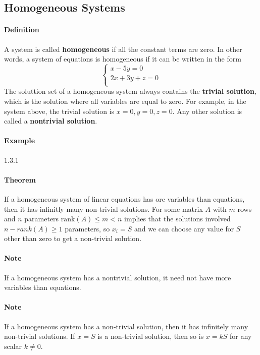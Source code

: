 \subsection{Homogeneous Systems}
\hrulefill

\paragraph*{Definition} A system is called \textbf{homogeneous} if all the constant terms are zero. In other words, a system of equations is homogeneous if it can be written in the form
\[\begin{cases}
    x-5y = 0 \\
    2x+3y+z = 0 \\
\end{cases}
\]
The soluttion set of a homogeneous system always contains the \textbf{trivial solution}, which is the solution where all variables are equal to zero. 
For example, in the system above, the trivial solution is \(x=0, y=0, z=0\).  Any other solution is called a \textbf{nontrivial solution}.

\paragraph*{Example} 1.3.1 %

\paragraph*{Theorem} If a homogeneous system of linear equations has ore variables than equations, 
then it has infinitly many non-trivial solutions. For some matrix $A$ with $m$ rows and $n$ parameters
 $\text{rank}(A) \leq m < n$ implies that the solutions involved $n-rank(A) \geq 1$ parameters, so $x_i = S$ and 
 we can choose any value for $S$ other than zero to get a non-trivial solution.
\paragraph*{Note} If a homogeneous system has a nontrivial solution, it need not have more variables than equations.
\paragraph*{Note} If a homogeneous system has a non-trivial solution, then it has infinitely many non-trivial solutions. If $x = S$ is a non-trivial solution, then so is $x = kS$ for any scalar $k \neq 0$.

